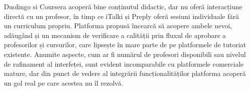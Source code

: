 Duolingo si Coursera acoperă bine conținutul didactic, dar nu oferă interacțiune directă cu un profesor, în timp ce iTalki și Preply oferă sesiuni individuale fără un curriculum propriu. Platforma propusă încearcă să acopere ambele nevoi, adăugând și un mecanism de verificare a calității prin fluxul de aprobare a profesorilor și cursurilor, care lipsește în mare parte de pe platformele de tutoriat existente. Anumite aspecte, cum ar fi numărul de profesori disponibili sau nivelul de rafinament al interfeței, sunt evident incomparabile cu platformele comerciale mature, dar din punct de vedere al integrării funcționalităților platforma acoperă un gol real pe care acestea nu îl rezolvă.
